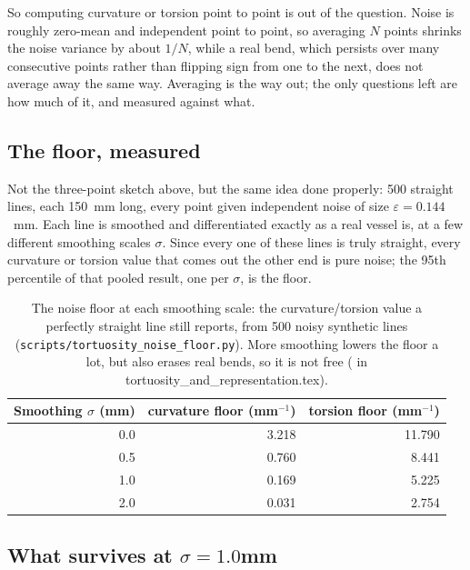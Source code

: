 So computing curvature or torsion point to point is out of the question. Noise is roughly
zero-mean and independent point to point, so averaging $N$ points shrinks the noise variance by
about $1/N$, while a real bend, which persists over many consecutive points rather than flipping
sign from one to the next, does not average away the same way. Averaging is the way out; the only
questions left are how much of it, and measured against what.

\subsection*{The floor, measured}

Not the three-point sketch above, but the same idea done properly: 500 straight lines, each
150~mm long, every point given independent noise of size $\varepsilon = 0.144$~mm. Each line is
smoothed and differentiated exactly as a real vessel is, at a few different smoothing scales
$\sigma$. Since every one of these lines is truly straight, every curvature or torsion value that
comes out the other end is pure noise; the 95th percentile of that pooled result, one per
$\sigma$, is the floor.

\begin{table}[htbp]
  \centering
  \small
  \begin{tabular}{@{}rrr@{}}
    \toprule
    Smoothing $\sigma$ (mm) & curvature floor (mm$^{-1}$) & torsion floor (mm$^{-1}$) \\
    \midrule
    0.0 & 3.218 & 11.790 \\
    0.5 & 0.760 & 8.441 \\
    1.0 & 0.169 & 5.225 \\
    2.0 & 0.031 & 2.754 \\
    \bottomrule
  \end{tabular}
  \caption{The noise floor at each smoothing scale: the curvature/torsion value a perfectly
    straight line still reports, from 500 noisy synthetic lines
    (\texttt{scripts/tortuosity\_noise\_floor.py}). More smoothing lowers the floor a lot, but
    also erases real bends, so it is not free ( in
    tortuosity\_and\_representation.tex).}
  \label{tab:week3-noise-floor}
\end{table}

\subsection*{What survives at $\sigma = 1.0$mm}

